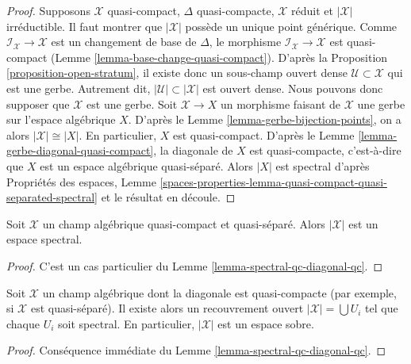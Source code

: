 \begin{proof}
\medskip\noindent
Supposons $\mathcal{X}$ quasi-compact, $\Delta$ quasi-compacte,
$\mathcal{X}$ réduit et $|\mathcal{X}|$ irréductible. Il faut montrer que
$|\mathcal{X}|$ possède un unique point générique. Comme
$\mathcal{I}_\mathcal{X} \to \mathcal{X}$ est un changement de base de
$\Delta$, le morphisme
$\mathcal{I}_\mathcal{X} \to \mathcal{X}$ est quasi-compact
(Lemme \ref{lemma-base-change-quasi-compact}). D'après la
Proposition \ref{proposition-open-stratum}, il existe donc un sous-champ
ouvert dense $\mathcal{U} \subset \mathcal{X}$ qui est une gerbe. Autrement
dit, $|\mathcal{U}| \subset |\mathcal{X}|$ est ouvert dense. Nous pouvons
donc supposer que $\mathcal{X}$ est une gerbe. Soit
$\mathcal{X} \to X$ un morphisme faisant de $\mathcal{X}$ une gerbe sur
l'espace algébrique $X$.
D'après le Lemme \ref{lemma-gerbe-bijection-points}, on a alors
$|\mathcal{X}| \cong |X|$. En particulier, $X$ est quasi-compact. D'après le
Lemme \ref{lemma-gerbe-diagonal-quasi-compact}, la diagonale de $X$ est
quasi-compacte, c'est-à-dire que $X$ est un espace algébrique quasi-séparé.
Alors $|X|$ est spectral d'après Propriétés des espaces, Lemme
\ref{spaces-properties-lemma-quasi-compact-quasi-separated-spectral}
et le résultat en découle.
\end{proof}

\begin{lemma}
\label{lemma-spectral-qcqs}
Soit $\mathcal{X}$ un champ algébrique quasi-compact et quasi-séparé.
Alors $|\mathcal{X}|$ est un espace spectral.
\end{lemma}

\begin{proof}
C'est un cas particulier du Lemme \ref{lemma-spectral-qc-diagonal-qc}.
\end{proof}

\begin{lemma}
\label{lemma-sober-qs}
Soit $\mathcal{X}$ un champ algébrique dont la diagonale est quasi-compacte
(par exemple, si $\mathcal{X}$ est quasi-séparé). Il existe alors un
recouvrement ouvert $|\mathcal{X}| = \bigcup U_i$ tel que chaque $U_i$ soit
spectral. En particulier, $|\mathcal{X}|$ est un espace sobre.
\end{lemma}

\begin{proof}
Conséquence immédiate du Lemme \ref{lemma-spectral-qc-diagonal-qc}.
\end{proof}






